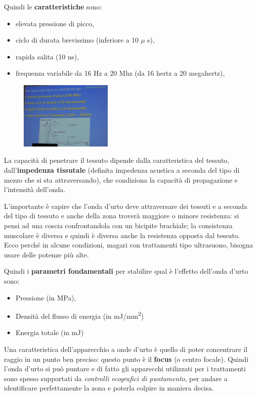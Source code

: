 Quindi le \textbf{caratteristiche} sono:

\begin{itemize}
\item
  elevata pressione di picco,
\item
  ciclo di durata brevissimo (inferiore a 10 $\mu$ s),
\item
  rapida salita (10 ns),
\item
  frequenza variabile da 16 Hz a 20 Mhz (da 16 hertz a 20 megahertz),
\end{itemize}

\begin{figure}[!ht]
\centering
\includegraphics[width=0.4\textwidth]{025/image2.jpeg}
\end{figure}

La capacità di penetrare il tessuto dipende dalla caratteristica del
tessuto, dall'\textbf{impedenza tissutale} (definita impedenza acustica
a seconda del tipo di mezzo che si sta attraversando), che condiziona la
capacità di propagazione e l'intensità dell'onda.

L'importante è capire che l'onda d'urto deve attraversare dei tessuti e
a seconda del tipo di tessuto e anche della zona troverà maggiore o
minore resistenza: si pensi ad una coscia confrontandola con un bicipite
brachiale; la consistenza muscolare è diversa e quindi è diversa anche
la resistenza opposta dal tessuto. Ecco perché in alcune condizioni,
magari con trattamenti tipo ultrasuono, bisogna usare delle potenze più
alte.

Quindi i \textbf{parametri fondamentali} per stabilire qual è l'effetto
dell'onda d'urto sono:

\begin{itemize}
\item
  Pressione (in MPa),
\item
  Densità del flusso di energia (in mJ/mm\textsuperscript{2})
\item
  Energia totale (in mJ)
\end{itemize}

Una caratteristica dell'apparecchio a onde d'urto è quello di poter
concentrare il raggio in un punto ben preciso: questo punto è il
\textbf{focus} (o centro focale). Quindi l'onda d'urto si può puntare e
di fatto gli apparecchi utilizzati per i trattamenti sono spesso
supportati da \emph{controlli ecografici di puntamento}, per andare a
identificare perfettamente la zona e poterla colpire in maniera decisa.

